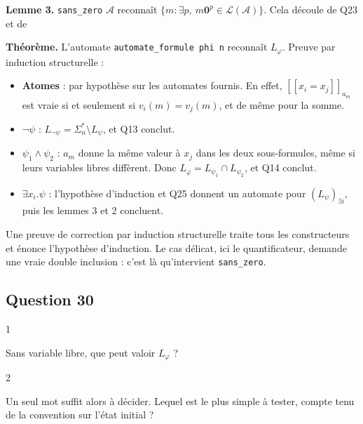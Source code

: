 \documentclass[11pt,a4paper]{article}
\providecommand{\tightlist}{\setlength{\itemsep}{0pt}\setlength{\parskip}{0pt}}
\newcommand{\equationajustee}[1]{%
  \sbox{\boiteequation}{$\displaystyle #1$}%
  \ifdim\wd\boiteequation>\linewidth
    \[\resizebox{\linewidth}{!}{\usebox{\boiteequation}}\]%
  \else
    \[#1\]%
  \fi}
\begin{document}
\textbf{Lemme 3.} \texttt{sans\_zero} \(\mathcal{A}\) reconnaît \(\{m:\exists p,\ m{\mathbf{0}}^p\in\mathcal{L}(\mathcal{A})\}\). Cela découle de Q23 et de
\equationajustee{\widehat{\delta}(q_0,m{\mathbf{0}}^p)=\bigcup_{q\in\widehat{\delta}(q_0,m)}\widehat{\delta}(q,{\mathbf{0}}^p).}

\textbf{Théorème.} L'automate \texttt{automate\_formule\ phi\ n} reconnaît \(L_\varphi\). Preuve par induction structurelle :

\begin{itemize}
\tightlist
\item
  \textbf{Atomes} : par hypothèse sur les automates fournis. En effet, \([\![x_i=x_j]\!]_{a_m}\) est vraie si et seulement si \(v_i(m)=v_j(m)\), et de même pour la somme.
\item
  \textbf{\(\neg\psi\)} : \(L_{\neg\psi}=\Sigma_n^*\setminus L_\psi\), et Q13 conclut.
\item
  \textbf{\(\psi_1\wedge\psi_2\)} : \(a_m\) donne la même valeur à \(x_j\) dans les deux sous-formules, même si leurs variables libres diffèrent. Donc \(L_\varphi=L_{\psi_1}\cap L_{\psi_2}\), et Q14 conclut.
\item
  \textbf{\(\exists x_i.\psi\)} : l'hypothèse d'induction et Q25 donnent un automate pour \((L_\psi)_{\exists i}\), puis les lemmes 3 et 2 concluent.
\end{itemize}

\begin{methode}

Une preuve de correction par induction structurelle traite tous les constructeurs et énonce l'hypothèse d'induction. Le cas délicat, ici le quantificateur, demande une vraie double inclusion : c'est là qu'intervient \texttt{sans\_zero}.

\end{methode}

\hypertarget{question-30}{%
\subsection{Question 30}\label{question-30}}

\begin{indication}{1}

Sans variable libre, que peut valoir \(L_\varphi\) ?

\end{indication}

\begin{indication}{2}

Un seul mot suffit alors à décider. Lequel est le plus simple à tester, compte tenu de la convention sur l'état initial ?

\end{indication}
\end{document}
